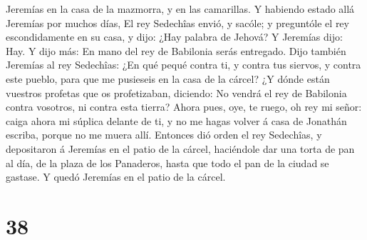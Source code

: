 Jeremías en la casa de la mazmorra, y en las camarillas. Y habiendo
estado allá Jeremías por muchos días,  El rey Sedechîas
envió, y sacóle; y preguntóle el rey escondidamente en su casa, y dijo:
¿Hay palabra de Jehová? Y Jeremías dijo: Hay. Y dijo más: En mano del
rey de Babilonia serás entregado.  Dijo también Jeremías
al rey Sedechîas: ¿En qué pequé contra ti, y contra tus siervos, y
contra este pueblo, para que me pusieseis en la casa de la cárcel?
 ¿Y dónde están vuestros profetas que os profetizaban,
diciendo: No vendrá el rey de Babilonia contra vosotros, ni contra esta
tierra?  Ahora pues, oye, te ruego, oh rey mi señor:
caiga ahora mi súplica delante de ti, y no me hagas volver á casa de
Jonathán escriba, porque no me muera allí.  Entonces dió
orden el rey Sedechîas, y depositaron á Jeremías en el patio de la
cárcel, haciéndole dar una torta de pan al día, de la plaza de los
Panaderos, hasta que todo el pan de la ciudad se gastase. Y quedó
Jeremías en el patio de la cárcel.

\hypertarget{section-37}{%
\section{38}\label{section-37}}

